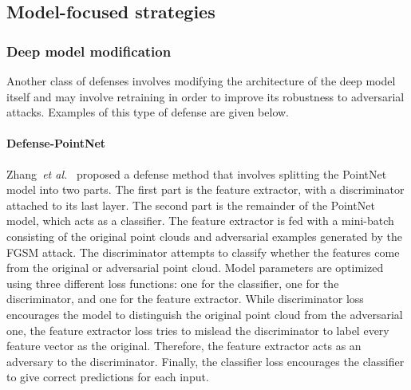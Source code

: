 \documentclass{ieeeaccess}
\def\etal{\textit{et al.}}
\begin{document}
\subsection{Model-focused strategies}

\subsubsection{Deep model modification}
\label{sec:Deep model modification}

Another class of defenses involves %
modifying the architecture of the deep model itself and may involve retraining in order to improve its robustness to adversarial attacks. %
Examples of this type of defense are given below.


\paragraph{Defense-PointNet}
\label{sec:Defense-PointNet}
Zhang~\etal~\cite{zhang2019defense} proposed a defense method that involves splitting the PointNet model into two parts. The first part is the feature extractor, with a discriminator attached to its last layer. %
The second part is the remainder of the PointNet model, which acts as a classifier. %
The feature extractor is fed with %
a mini-batch consisting of the original point clouds and adversarial examples generated by the FGSM attack. %
The discriminator attempts to classify whether the features come from the original or adversarial point cloud.
Model parameters are optimized using three different loss functions: one for the classifier, one for the discriminator, and one for the feature extractor. While discriminator loss encourages the model to distinguish the original point cloud from the adversarial one, the feature extractor loss tries to mislead the discriminator to label every feature %
vector as the original. Therefore, the feature extractor acts as an adversary to the discriminator. Finally, the classifier loss encourages the classifier to give correct predictions for each input.
\end{document}
